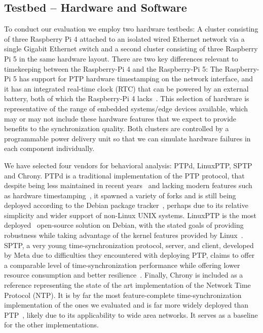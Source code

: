 

\subsection{Testbed -- Hardware and Software}

To conduct our evaluation we employ two hardware testbeds: A cluster consisting of three Raspberry Pi 4 attached to an isolated wired Ethernet network via a single Gigabit Ethernet switch and a second cluster consisting of three Raspberry Pi 5 in the same hardware layout. There are two key differences relevant to timekeeping between the Raspberry-Pi 4 and the Raspberry-Pi 5: The Raspberry-Pi 5 has support for PTP hardware timestamping on the network interface, and it has an integrated real-time clock (RTC) that can be powered by an external battery, both of which the Raspberry-Pi 4 lacks~\cite{raspberry-pi-datasheets}. This selection of hardware is representative of the range of embedded systems/edge devices available, which may or may not include these hardware features that we expect to provide benefits to the synchronization quality. Both clusters are controlled by a programmable power delivery unit so that we can simulate hardware failures in each component individually.

We have selected four vendors for behavioral analysis: PTPd, LinuxPTP, SPTP and Chrony. PTPd is a traditional implementation of the PTP protocol, that despite being less maintained in recent years~\cite{ptpd-maintainers} and lacking modern features such as hardware timestamping~\cite{ptpd-manpage}, it spawned a variety of forks and is still being deployed according to the Debian package tracker~\cite{debian-popularity-contest}, perhaps due to its relative simplicity and wider support of non-Linux UNIX systems. LinuxPTP is the most deployed~\cite{debian-popularity-contest} open-source solution on Debian, with the stated goals of providing robustness while taking advantage of the kernel features provided by Linux~\cite{linuxptp-homepage}. SPTP, a very young time-synchronization protocol, server, and client, developed by Meta due to difficulties they encountered with deploying PTP, claims to offer a comparable level of time-synchronization performance while offering lower resource consumption and better resilience~\cite{facebook-sptp}. Finally, Chrony is included as a reference representing the state of the art implementation of the Network Time Protocol (NTP). It is by far the most feature-complete time-synchronization implementation of the ones we evaluated and is far more widely deployed than PTP~\cite{debian-popularity-contest}, likely due to its applicability to wide area networks. It serves as a baseline for the other implementations.

